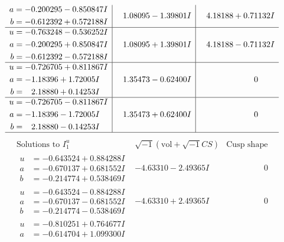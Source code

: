 \documentclass[1p]{elsarticle_modified}
\theoremstyle{definition}
\newcommand{\I}{\sqrt{-1}}
\begin{document}
$$\begin{array}{c|c|c}
\begin{aligned}
a &= -0.200295 - 0.850847 I \\
b &= -0.612392 + 0.572188 I\end{aligned}
 & \phantom{-}1.08095 - 1.39801 I & \phantom{-}4.18188 + 0.71132 I \\ \hline\begin{aligned}
u &= -0.763248 - 0.536252 I \\
a &= -0.200295 + 0.850847 I \\
b &= -0.612392 - 0.572188 I\end{aligned}
 & \phantom{-}1.08095 + 1.39801 I & \phantom{-}4.18188 - 0.71132 I \\ \hline\begin{aligned}
u &= -0.726705 + 0.811867 I \\
a &= -1.18396 + 1.72005 I \\
b &= \phantom{-}2.18880 + 0.14253 I\end{aligned}
 & \phantom{-}1.35473 - 0.62400 I & \phantom{-0.000000 } 0 \\ \hline\begin{aligned}
u &= -0.726705 - 0.811867 I \\
a &= -1.18396 - 1.72005 I \\
b &= \phantom{-}2.18880 - 0.14253 I\end{aligned}
 & \phantom{-}1.35473 + 0.62400 I & \phantom{-0.000000 } 0\\
 \hline 
 \end{array}$$\newpage$$\begin{array}{c|c|c}  
\text{Solutions to }I^u_{1}& \I (\text{vol} + \sqrt{-1}CS) & \text{Cusp shape}\\
 \hline 
\begin{aligned}
u &= -0.643524 + 0.884288 I \\
a &= -0.670137 + 0.681552 I \\
b &= -0.214774 + 0.538469 I\end{aligned}
 & -4.63310 - 2.49365 I & \phantom{-0.000000 } 0 \\ \hline\begin{aligned}
u &= -0.643524 - 0.884288 I \\
a &= -0.670137 - 0.681552 I \\
b &= -0.214774 - 0.538469 I\end{aligned}
 & -4.63310 + 2.49365 I & \phantom{-0.000000 } 0 \\ \hline\begin{aligned}
u &= -0.810251 + 0.764677 I \\
a &= -0.614704 + 1.099300 I \\

\end{aligned}
\end{array}$$
\end{document}
